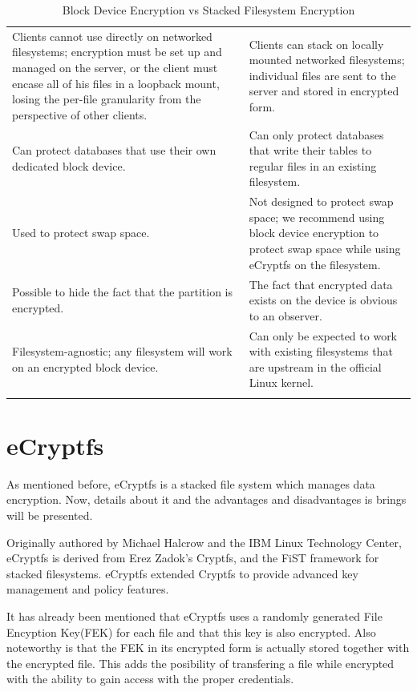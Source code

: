 \begin{center}
\begin{table}[tp]
\begin{tabularx}{\textwidth}{|| m{} || m{} ||}
		\hhline{|:=::=:|}
		Clients cannot use directly on networked filesystems; encryption must be set up and managed on the server, or the client must encase all of his files in a loopback mount, losing the per-file granularity from the perspective of other clients. & Clients can stack on locally mounted networked filesystems; individual files are sent to the server and stored in encrypted form. \\
		\hhline{|:=::=:|}
		Can protect databases that use their own dedicated block device. & Can only protect databases that write their tables to regular files in an existing filesystem. \\
		\hhline{|:=::=:|}
		Used to protect swap space. & Not designed to protect swap space; we recommend using block device encryption to protect swap space while using eCryptfs on the filesystem. \\
		\hhline{|:=::=:|}
		Possible to hide the fact that the partition is encrypted. & The fact that encrypted data exists on the device is obvious to an observer. \\
		\hhline{|:=::=:|}
		Filesystem-agnostic; any filesystem will work on an encrypted block device. & Can only be expected to work with existing filesystems that are upstream in the official Linux kernel. \\
		\hhline{|b:=:b:=:b|}
	\end{tabularx}
	\caption{Block Device Encryption vs Stacked Filesystem Encryption}
\end{table}
\end{center}
\newpage

\section{eCryptfs}
\label{sec:de-ecryptfs}

As mentioned before, eCryptfs is a stacked file system which manages data encryption. Now, details about it and the advantages and disadvantages is brings will be presented.

Originally authored by Michael Halcrow and the IBM Linux Technology Center, eCryptfs is derived from Erez Zadok's Cryptfs, and the FiST framework for stacked filesystems. eCryptfs extended Cryptfs to provide advanced key management and policy features.\cite{ecryptfs-paper}

It has already been mentioned that eCryptfs uses a randomly generated File Encyption Key(FEK) for each file and that this key is also encrypted. Also noteworthy is that the FEK in its encrypted form is actually stored together with the encrypted file. This adds the posibility of transfering a file while encrypted with the ability to gain access with the proper credentials.

